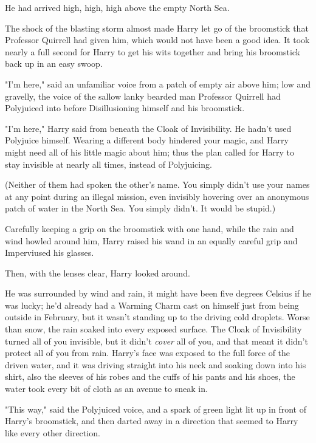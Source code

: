 He had arrived high, high, high above the empty North Sea.

The shock of the blasting storm almost made Harry let go of the broomstick that 
Professor Quirrell had given him, which would not have been a good idea. It 
took nearly a full second for Harry to get his wits together and bring his 
broomstick back up in an easy swoop.

"I'm here," said an unfamiliar voice from a patch of empty air above him; low 
and gravelly, the voice of the sallow lanky bearded man Professor Quirrell had 
Polyjuiced into before Disillusioning himself and his broomstick.

"I'm here," Harry said from beneath the Cloak of Invisibility. He hadn't used 
Polyjuice himself. Wearing a different body hindered your magic, and Harry 
might need all of his little magic about him; thus the plan called for Harry to 
stay invisible at nearly all times, instead of Polyjuicing.

(Neither of them had spoken the other's name. You simply didn't use your names 
at any point during an illegal mission, even invisibly hovering over an 
anonymous patch of water in the North Sea. You simply didn't. It would be 
stupid.)

Carefully keeping a grip on the broomstick with one hand, while the rain and 
wind howled around him, Harry raised his wand in an equally careful grip and 
Imperviused his glasses.

Then, with the lenses clear, Harry looked around.

He was surrounded by wind and rain, it might have been five degrees Celsius if 
he was lucky; he'd already had a Warming Charm cast on himself just from being 
outside in February, but it wasn't standing up to the driving cold droplets. 
Worse than snow, the rain soaked into every exposed surface. The Cloak of 
Invisibility turned all of you invisible, but it didn't \emph{cover} all of 
you, and that meant it didn't protect all of you from rain. Harry's face was 
exposed to the full force of the driven water, and it was driving straight into 
his neck and soaking down into his shirt, also the sleeves of his robes and the 
cuffs of his pants and his shoes, the water took every bit of cloth as an 
avenue to sneak in.

"This way," said the Polyjuiced voice, and a spark of green light lit up in 
front of Harry's broomstick, and then darted away in a direction that seemed to 
Harry like every other direction.

